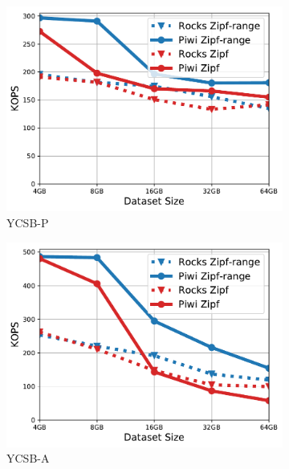 \begin{figure}[tb]
\centering
\begin{subfigure}{0.3\linewidth}
\includegraphics[width=\textwidth]{figs/Workload_P_line.pdf}
\caption{YCSB-P}
\label{fig:throughput:p}
\end{subfigure}
\begin{subfigure}{0.3\linewidth}
\includegraphics[width=\textwidth]{figs/Workload_A_line.pdf}
\caption{YCSB-A}
\label{fig:throughput:a}
\end{subfigure}
\begin{subfigure}{0.3\linewidth}

\end{subfigure}
\end{figure}
